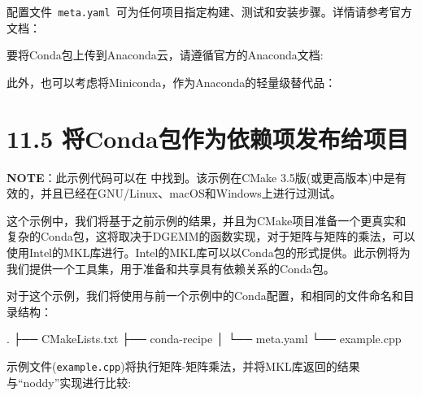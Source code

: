 配置文件\texttt{ meta.yaml }可为任何项目指定构建、测试和安装步骤。详情请参考官方文档：

要将Conda包上传到Anaconda云，请遵循官方的Anaconda文档: 

此外，也可以考虑将Miniconda，作为Anaconda的轻量级替代品：


\section{11.5 将Conda包作为依赖项发布给项目}

\begin{myInfoBox}
\textbf{NOTE}：此示例代码可以在  中找到。该示例在CMake 3.5版(或更高版本)中是有效的，并且已经在GNU/Linux、macOS和Windows上进行过测试。
\end{myInfoBox}

这个示例中，我们将基于之前示例的结果，并且为CMake项目准备一个更真实和复杂的Conda包，这将取决于DGEMM的函数实现，对于矩阵与矩阵的乘法，可以使用Intel的MKL库进行。Intel的MKL库可以以Conda包的形式提供。此示例将为我们提供一个工具集，用于准备和共享具有依赖关系的Conda包。


对于这个示例，我们将使用与前一个示例中的Conda配置，和相同的文件命名和目录结构：

\begin{codebox}[shell]
.
├── CMakeLists.txt
├── conda-recipe
│    └── meta.yaml
└── example.cpp
\end{codebox}

示例文件(\texttt{example.cpp})将执行矩阵-矩阵乘法，并将MKL库返回的结果与“noddy”实现进行比较:

